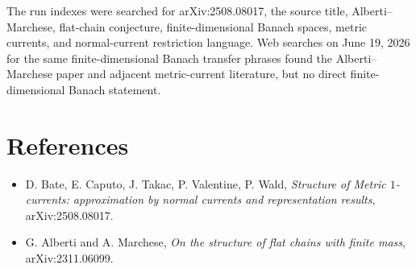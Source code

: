 \documentclass[11pt]{amsart}
\begin{document}
The run indexes were searched for arXiv:2508.08017, the source title,
Alberti--Marchese, flat-chain conjecture, finite-dimensional Banach spaces,
metric currents, and normal-current restriction language. Web searches on
June 19, 2026 for the same finite-dimensional Banach transfer phrases found
the Alberti--Marchese paper and adjacent metric-current literature, but no
direct finite-dimensional Banach statement.

\section*{References}

\begin{itemize}
\item D. Bate, E. Caputo, J. Takac, P. Valentine, P. Wald,
\emph{Structure of Metric \(1\)-currents: approximation by normal currents and
representation results}, arXiv:2508.08017.
\item G. Alberti and A. Marchese, \emph{On the structure of flat chains with
finite mass}, arXiv:2311.06099.
\end{itemize}
\end{document}
